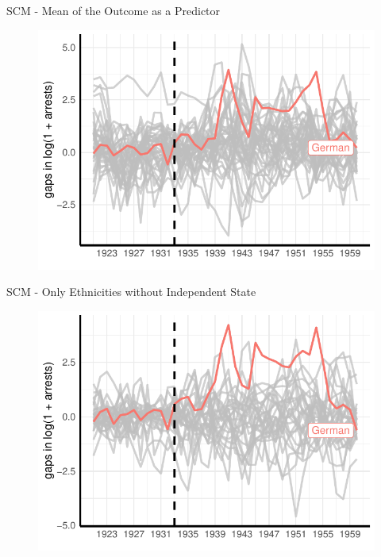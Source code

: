 \documentclass[11pt]{beamer}
\begin{document}
\begin{frame}[label=sc_mean]{SCM - Mean of the Outcome as a Predictor}
 \begin{figure}[h]
\centering
\includegraphics[width=1\textwidth]{placebo_highlight_all_imp_date_robustnes.pdf}
\end{figure}
\hyperlink{sc_robustness_checks}{}
\end{frame}

\begin{frame}[label=sc_without_ind_state]{SCM - Only Ethnicities without Independent State}
 \begin{figure}[h]
\centering
\includegraphics[width=1\textwidth]{placebo_highlight_all_ethnicities_without_ind_state.pdf}
\end{figure}
\hyperlink{sc_robustness_checks}{}
\end{frame}
\end{document}
